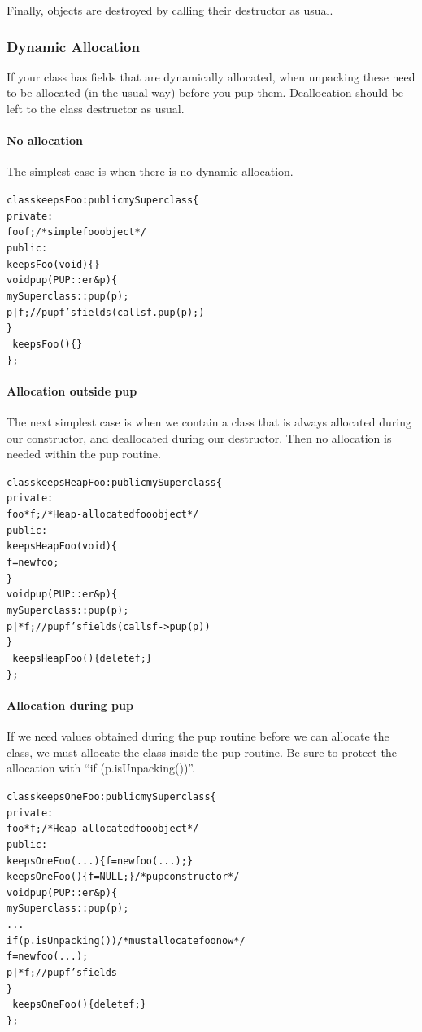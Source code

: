 Finally, objects are destroyed by calling their destructor
as usual.



\subsubsection{Dynamic Allocation}

\label{sec:pupdynalloc}

If your class has fields that are dynamically allocated, when unpacking
these need to be allocated (in the usual way) before you pup them.
Deallocation should be left to the class destructor as usual.

\paragraph{No allocation}

The simplest case is when there is no dynamic allocation.
\begin{alltt}
class keepsFoo : public mySuperclass \{
private:
    foo f; /* simple foo object*/
public:
    keepsFoo(void) \{ \}
    void pup(PUP::er &p) \{
      mySuperclass::pup(p);
      p|f; // pup f's fields (calls f.pup(p);) 
    \}
    ~keepsFoo() \{ \}
\};
\end{alltt}

\paragraph{Allocation outside pup}

The next simplest case is when we contain a class 
that is always allocated during our constructor,
and deallocated during our destructor.  Then no allocation
is needed within the pup routine.
\begin{alltt}
class keepsHeapFoo : public mySuperclass \{
private:
    foo *f; /*Heap-allocated foo object*/
public:
    keepsHeapFoo(void) \{
      f=new foo;
    \}
    void pup(PUP::er &p) \{
      mySuperclass::pup(p);
      p|*f; // pup f's fields (calls f->pup(p))
    \}
    ~keepsHeapFoo() \{delete f;\}
\};
\end{alltt}

\paragraph{Allocation during pup}

If we need values obtained during the pup routine
before we can allocate the class, we must 
allocate the class inside the pup routine.
Be sure to protect the allocation with ``if (p.isUnpacking())''.
\begin{alltt}
class keepsOneFoo : public mySuperclass \{
private:
    foo *f; /*Heap-allocated foo object*/
public:
    keepsOneFoo(...) \{f=new foo(...);\}
    keepsOneFoo() \{f=NULL;\} /* pup constructor */
    void pup(PUP::er &p) \{
      mySuperclass::pup(p);
      ...
      if (p.isUnpacking()) /* must allocate foo now */
         f=new foo(...);
      p|*f;//pup f's fields
    \}
    ~keepsOneFoo() \{delete f;\}
\};
\end{alltt}

